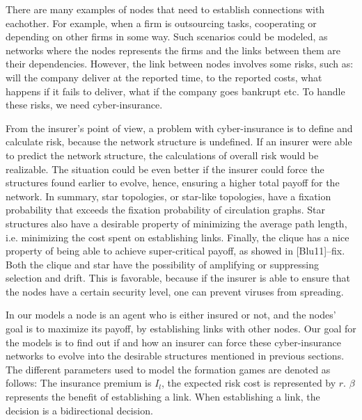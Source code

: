
There are many examples of nodes that need to establish connections with eachother.
For example, when a firm is outsourcing tasks, cooperating or depending on other
firms in some way. Such scenarios could be modeled, as networks where the nodes
represents the firms and the links between them are their dependencies. However,
the link between nodes involves some risks, such as: will the company deliver at the
reported time, to the reported costs, what happens if it fails to deliver, what if the
company goes bankrupt etc. To handle these risks, we need cyber-insurance.

From the insurer’s point of view, a problem with cyber-insurance is to define and calculate risk, because the network structure is
undefined. If an insurer were able to predict the network structure, the calculations
of overall risk would be realizable. The situation could be even better if the insurer
could force the structures found earlier to evolve, hence, ensuring a higher
total payoff for the network. In summary, star topologies, or
star-like topologies, have a fixation probability that exceeds the fixation probability
of circulation graphs. Star structures also have a desirable property of minimizing the
average path length, i.e. minimizing the cost spent on establishing links. Finally, the
clique has a nice property of being able to achieve super-critical payoff, as showed in
[Blu11]--fix. Both the clique and star have the possibility of amplifying or suppressing selection and drift. This is favorable, because if the insurer is able to ensure that the nodes have a certain security level, one can prevent viruses from spreading.

In our models a node is an agent who is either insured or not, and the nodes’ goal is to maximize its payoff, by establishing links with other nodes. Our goal for the models is to find out if and how an insurer can force these cyber-insurance networks to evolve into the desirable structures mentioned in previous sections.
The different parameters used to model the formation games are denoted as follows: The insurance premium is $I_{l}$, the expected risk cost is represented by $r$. $\beta$ represents the benefit of establishing a link. When establishing a link, the decision is a bidirectional decision.  
 
